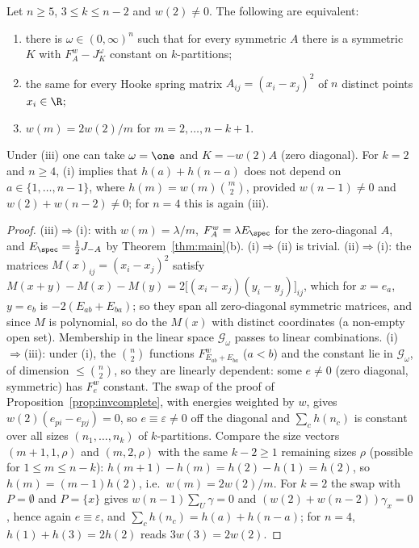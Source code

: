 \begin{proposition}\label{prop:weights}
Let $n\ge5$, $3\le k\le n-2$ and $w(2)\ne0$. The following are equivalent:
\begin{enumerate}[label=(\roman*),leftmargin=2em]
\item there is $\omega\in(0,\infty)^n$ such that for every symmetric $A$ there is a symmetric $K$ with $F^w_A-J^\omega_K$ constant on $k$-partitions;
\item the same for every Hooke spring matrix $A_{ij}=(x_i-x_j)^2$ of $n$ distinct points $x_i\in\R$;
\item $w(m)=2w(2)/m$ for $m=2,\dots,n-k+1$.
\end{enumerate}
Under (iii) one can take $\omega=\one$ and $K=-w(2)A$ (zero diagonal). For $k=2$ and $n\ge4$, (i) implies that $h(a)+h(n-a)$ does not depend on $a\in\{1,\dots,n-1\}$, where $h(m)=w(m)\binom m2$, provided $w(n-1)\ne0$ and $w(2)+w(n-2)\ne0$; for $n=4$ this is again (iii). 
\end{proposition}
\begin{proof}
(iii)$\Rightarrow$(i): with $w(m)=\lambda/m$, $F^w_A=\lambda E_\spec$ for the zero-diagonal $A$, and $E_\spec=\tfrac12J_{-A}$ by Theorem~\ref{thm:main}(b). (i)$\Rightarrow$(ii) is trivial. (ii)$\Rightarrow$(i): the matrices $M(x)_{ij}=(x_i-x_j)^2$ satisfy $M(x+y)-M(x)-M(y)=2\bigl[(x_i-x_j)(y_i-y_j)\bigr]_{ij}$, which for $x=e_a$, $y=e_b$ is $-2(E_{ab}+E_{ba})$; so they span all zero-diagonal symmetric matrices, and since $M$ is polynomial, so do the $M(x)$ with distinct coordinates (a non-empty open set). Membership in the linear space $\mathcal G_\omega$ passes to linear combinations. (i)$\Rightarrow$(iii): under (i), the $\binom n2$ functions $F^w_{E_{ab}+E_{ba}}$ ($a<b$) and the constant lie in $\mathcal G_\omega$, of dimension $\le\binom n2$, so they are linearly dependent: some $e\ne0$ (zero diagonal, symmetric) has $F^w_e$ constant. The swap of the proof of Proposition~\ref{prop:invcomplete}, with energies weighted by $w$, gives $w(2)(e_{pi}-e_{pj})=0$, so $e\equiv\varepsilon\ne0$ off the diagonal and $\sum_ch(n_c)$ is constant over all sizes $(n_1,\dots,n_k)$ of $k$-partitions. Compare the size vectors $(m+1,1,\rho)$ and $(m,2,\rho)$ with the same $k-2\ge1$ remaining sizes $\rho$ (possible for $1\le m\le n-k$): $h(m+1)-h(m)=h(2)-h(1)=h(2)$, so $h(m)=(m-1)h(2)$, i.e.\ $w(m)=2w(2)/m$. For $k=2$ the swap with $P=\emptyset$ and $P=\{x\}$ gives $w(n-1)\sum_{U}\gamma=0$ and $(w(2)+w(n-2))\gamma_x=0$, hence again $e\equiv\varepsilon$, and $\sum_ch(n_c)=h(a)+h(n-a)$; for $n=4$, $h(1)+h(3)=2h(2)$ reads $3w(3)=2w(2)$.
\end{proof}

